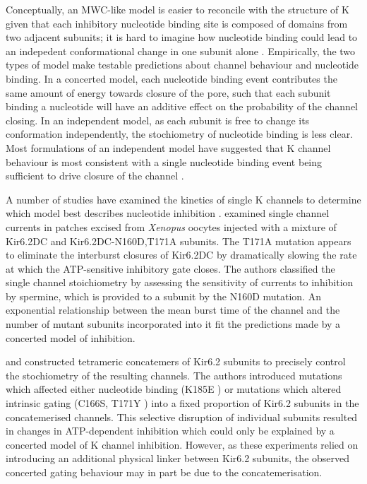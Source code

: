 Conceptually, an MWC-like model is easier to reconcile with the structure of K\ATP{} given that each inhibitory nucleotide binding site is composed of domains from two adjacent subunits; it is hard to imagine how nucleotide binding could lead to an indepedent conformational change in one subunit alone \cite{craig_how_2008-1}.
Empirically, the two types of model make testable predictions about channel behaviour and nucleotide binding.
In a concerted model, each nucleotide binding event contributes the same amount of energy towards closure of the pore, such that each subunit binding a nucleotide will have an additive effect on the probability of the channel closing.
In an independent model, as each subunit is free to change its conformation independently, the stochiometry of nucleotide binding is less clear.
Most formulations of an independent model have suggested that K\ATP{} channel behaviour is most consistent with a single nucleotide binding event being sufficient to drive closure of the channel \cite{trapp_molecular_1998, markworth_atp4-_2000, li_open_2002, fang_n-terminal_2006-1}.

A number of studies have examined the kinetics of single K\ATP{} channels to determine which model best describes nucleotide inhibition \cite{drain_concerted_2004, fang_n-terminal_2006-1, wang_subunit-stoichiometric_2007, craig_how_2008-1}.
\cite{drain_concerted_2004} examined single channel currents in patches excised from \textit{Xenopus} oocytes injected with a mixture of Kir6.2\textgreek{D}C and Kir6.2\textgreek{D}C-N160D,T171A subunits.
The T171A mutation appears to eliminate the interburst closures of Kir6.2\textgreek{D}C by dramatically slowing the rate at which the ATP-sensitive inhibitory gate closes.
The authors classified the single channel stoichiometry by assessing the sensitivity of currents to inhibition by spermine, which is provided to a subunit by the N160D mutation.
An exponential relationship between the mean burst time of the channel and the number of mutant subunits incorporated into it fit the predictions made by a concerted model of inhibition.

\textcite{wang_subunit-stoichiometric_2007} and \textcite{craig_how_2008-1} constructed tetrameric concatemers of Kir6.2 subunits to precisely control the stochiometry of the resulting channels.
The authors introduced mutations which affected either nucleotide binding (K185E \cite{wang_subunit-stoichiometric_2007, craig_how_2008-1}) or mutations which altered intrinsic gating (C166S, T171Y \cite{wang_subunit-stoichiometric_2007}) into a fixed proportion of Kir6.2 subunits in the concatemerised channels.
This selective disruption of individual subunits resulted in changes in ATP-dependent inhibition which could only be explained by a concerted model of K\ATP{} channel inhibition.
However, as these experiments relied on introducing an additional physical linker between Kir6.2 subunits, the observed concerted gating behaviour may in part be due to the concatemerisation.

